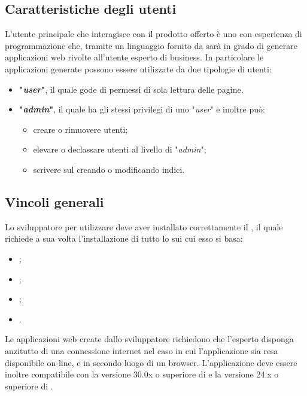	\subsection{Caratteristiche degli utenti}
	L'utente principale che interagisce con il prodotto offerto è uno  con esperienza di programmazione che, tramite un linguaggio  fornito da \ProjectName{} sarà in grado di generare applicazioni web rivolte all'utente esperto di business. In particolare le applicazioni generate possono essere utilizzate da due tipologie di utenti:
	\begin{itemize}
		\item \textbf{"\textit{user}"}, il quale gode di permessi di sola lettura delle pagine. 
		\item \textbf{"\textit{admin}"}, il quale ha gli stessi privilegi di uno "\textit{user}" e inoltre può:
		\begin{itemize}
			\item creare o rimuovere utenti;
			\item elevare o declassare utenti al livello di "\textit{admin}";
			\item scrivere sul  creando o modificando indici.
		\end{itemize}		 	
	\end{itemize}
	
	\subsection{Vincoli generali}
	Lo sviluppatore per utilizzare \ProjectName{} deve aver installato correttamente il , il quale richiede a sua volta l'installazione di tutto lo  sui cui esso si basa:
	\begin{itemize}
		\item \textbf{};
		\item \textbf{};
		\item \textbf{};
		\item \textbf{}.
	\end{itemize}
	Le applicazioni web create dallo sviluppatore richiedono che l'esperto  disponga anzitutto di una connessione internet nel caso in cui l'applicazione sia resa disponibile on-line, e in secondo luogo di un browser. L'applicazione deve essere inoltre compatibile con la versione 30.0x o superiore di  e la versione 24.x o superiore di .